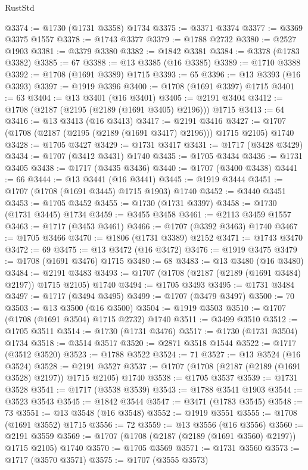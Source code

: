 \begin{lexlean}{RustStd}
\begin{coremodule}
@3374 := @1730 (@1731 @3358) @1734
@3375 := @3371 @3374
@3377 := @3369 @3375 @1557
@3378 := @1743 @3377
@3379 := @1788 @2732
@3380 := @2527 @1903
@3381 := @3379 @3380
@3382 := @1842 @3381
@3384 := @3378 (@1783 @3382)
@3385 := 67
@3388 := @13 @3385 (@16 @3385)
@3389 := @1710 @3388
@3392 := @1708 (@1691 @3389) @1715
@3393 := 65
@3396 := @13 @3393 (@16 @3393)
@3397 := @1919 @3396
@3400 := @1708 (@1691 @3397) @1715
@3401 := 63
@3404 := @13 @3401 (@16 @3401)
@3405 := @2191 @3404
@3412 := @1708 (@2187 (@2195 (@2189 (@1691 @3405) @2196))) @1715
@3413 := 64
@3416 := @13 @3413 (@16 @3413)
@3417 := @2191 @3416
@3427 := @1707 (@1708 (@2187 (@2195 (@2189 (@1691 @3417) @2196))) @1715 @2105) @1740
@3428 := @1705 @3427
@3429 := @1731 @3417
@3431 := @1717 (@3428 @3429)
@3434 := @1707 (@3412 @3431) @1740
@3435 := @1705 @3434
@3436 := @1731 @3405
@3438 := @1717 (@3435 @3436)
@3440 := @1707 (@3400 @3438)
@3441 := 66
@3444 := @13 @3441 (@16 @3441)
@3445 := @1919 @3444
@3451 := @1707 (@1708 (@1691 @3445) @1715 @1903) @1740
@3452 := @3440 @3451
@3453 := @1705 @3452
@3455 := @1730 (@1731 @3397)
@3458 := @1730 (@1731 @3445) @1734
@3459 := @3455 @3458
@3461 := @2113 @3459 @1557
@3463 := @1717 (@3453 @3461)
@3466 := @1707 (@3392 @3463) @1740
@3467 := @1705 @3466
@3470 := @1806 (@1731 @3389) @2152
@3471 := @1743 @3470
@3472 := 69
@3475 := @13 @3472 (@16 @3472)
@3476 := @1919 @3475
@3479 := @1708 (@1691 @3476) @1715
@3480 := 68
@3483 := @13 @3480 (@16 @3480)
@3484 := @2191 @3483
@3493 := @1707 (@1708 (@2187 (@2189 (@1691 @3484) @2197)) @1715 @2105) @1740
@3494 := @1705 @3493
@3495 := @1731 @3484
@3497 := @1717 (@3494 @3495)
@3499 := @1707 (@3479 @3497)
@3500 := 70
@3503 := @13 @3500 (@16 @3500)
@3504 := @1919 @3503
@3510 := @1707 (@1708 (@1691 @3504) @1715 @2732) @1740
@3511 := @3499 @3510
@3512 := @1705 @3511
@3514 := @1730 (@1731 @3476)
@3517 := @1730 (@1731 @3504) @1734
@3518 := @3514 @3517
@3520 := @2871 @3518 @1544
@3522 := @1717 (@3512 @3520)
@3523 := @1788 @3522
@3524 := 71
@3527 := @13 @3524 (@16 @3524)
@3528 := @2191 @3527
@3537 := @1707 (@1708 (@2187 (@2189 (@1691 @3528) @2197)) @1715 @2105) @1740
@3538 := @1705 @3537
@3539 := @1731 @3528
@3541 := @1717 (@3538 @3539)
@3543 := @1788 @3541 @1903
@3544 := @3523 @3543
@3545 := @1842 @3544
@3547 := @3471 (@1783 @3545)
@3548 := 73
@3551 := @13 @3548 (@16 @3548)
@3552 := @1919 @3551
@3555 := @1708 (@1691 @3552) @1715
@3556 := 72
@3559 := @13 @3556 (@16 @3556)
@3560 := @2191 @3559
@3569 := @1707 (@1708 (@2187 (@2189 (@1691 @3560) @2197)) @1715 @2105) @1740
@3570 := @1705 @3569
@3571 := @1731 @3560
@3573 := @1717 (@3570 @3571)
@3575 := @1707 (@3555 @3573)

\end{coremodule}
\end{lexlean}
